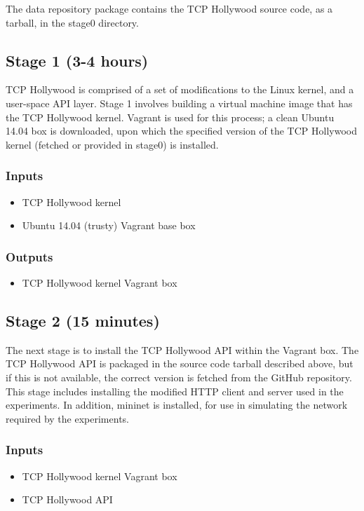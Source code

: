 \documentclass[sigconf]{acmart}
\begin{document}
The data repository package contains the TCP Hollywood source code, as a tarball, in the
stage0 directory.

\subsection*{Stage 1 (3-4 hours)}

TCP Hollywood is comprised of a set of modifications to the Linux kernel, and a user-space
API layer. Stage 1 involves building a virtual machine image that has the TCP
Hollywood kernel. Vagrant is used for this process; a clean Ubuntu 14.04 box is downloaded,
upon which the specified version of the TCP Hollywood kernel (fetched or provided in stage0) is installed.

\subsubsection*{Inputs}
\begin{itemize}
\item TCP Hollywood kernel
\item Ubuntu 14.04 (trusty) Vagrant base box
\end{itemize}
\subsubsection*{Outputs}
\begin{itemize}
\item TCP Hollywood kernel Vagrant box
\end{itemize}

\subsection*{Stage 2 (15 minutes)}

The next stage is to install the TCP Hollywood API within the Vagrant box. The TCP
Hollywood API is packaged in the source code tarball described above, but if this is not
available, the correct version is fetched from the GitHub repository. This stage includes
installing the modified HTTP client and server used in the experiments. In addition,
mininet is installed, for use in simulating the network required by the experiments.

\subsubsection*{Inputs}
\begin{itemize}
\item TCP Hollywood kernel Vagrant box
\item TCP Hollywood API
\end{itemize}
\end{document}
